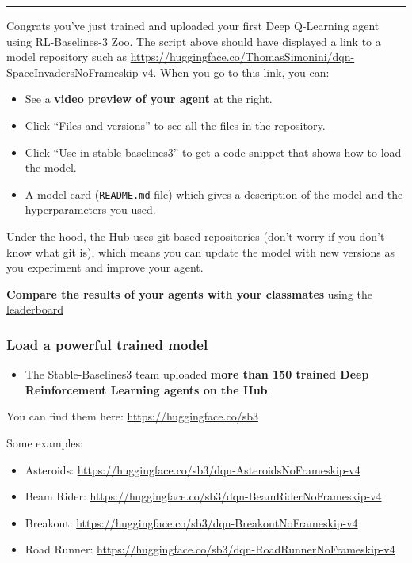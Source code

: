\documentclass[11pt,a4paper]{article}
\begin{document}
\begin{center}\rule{0.5\linewidth}{0.5pt}\end{center}

Congrats you've just trained and uploaded your first Deep Q-Learning agent using RL-Baselines-3 Zoo. The script above should have displayed a link to a model repository such as \url{https://huggingface.co/ThomasSimonini/dqn-SpaceInvadersNoFrameskip-v4}. When you go to this link, you can:

\begin{itemize}
\tightlist
\item
  See a \textbf{video preview of your agent} at the right.
\item
  Click ``Files and versions'' to see all the files in the repository.
\item
  Click ``Use in stable-baselines3'' to get a code snippet that shows how to load the model.
\item
  A model card (\texttt{README.md} file) which gives a description of the model and the hyperparameters you used.
\end{itemize}

Under the hood, the Hub uses git-based repositories (don't worry if you don't know what git is), which means you can update the model with new versions as you experiment and improve your agent.

\textbf{Compare the results of your agents with your classmates} using the \href{https://huggingface.co/spaces/huggingface-projects/Deep-Reinforcement-Learning-Leaderboard}{leaderboard}

\subsubsection{Load a powerful trained model}\label{load-a-powerful-trained-model}

\begin{itemize}
\tightlist
\item
  The Stable-Baselines3 team uploaded \textbf{more than 150 trained Deep Reinforcement Learning agents on the Hub}.
\end{itemize}

You can find them here: \url{https://huggingface.co/sb3}

Some examples:

\begin{itemize}
\tightlist
\item
  Asteroids: \url{https://huggingface.co/sb3/dqn-AsteroidsNoFrameskip-v4}
\item
  Beam Rider: \url{https://huggingface.co/sb3/dqn-BeamRiderNoFrameskip-v4}
\item
  Breakout: \url{https://huggingface.co/sb3/dqn-BreakoutNoFrameskip-v4}
\item
  Road Runner: \url{https://huggingface.co/sb3/dqn-RoadRunnerNoFrameskip-v4}
\end{itemize}
\end{document}
